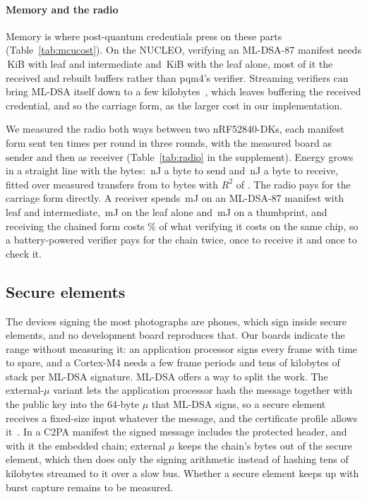 \paragraph{Memory and the radio}
Memory is where post-quantum credentials press on these parts
(Table~\ref{tab:mcucost}). On the NUCLEO, verifying an ML-DSA-87 manifest
needs \NramChainDSAeightyseven\,KiB with leaf and intermediate and
\NramLeafDSAeightyseven\,KiB with the leaf alone, most of it the received and
rebuilt buffers rather than pqm4's verifier. Streaming verifiers can bring
ML-DSA itself down to a few
kilobytes~\cite{gonzalez2021verifying,bos2022dilithium}, which leaves buffering the
received credential, and so the carriage form, as the larger cost in our
implementation.


We measured the radio both ways between two nRF52840-DKs, each manifest form
sent ten times per round in three rounds, with the measured board as sender
and then as receiver (Table~\ref{tab:radio} in the supplement). Energy grows in a straight line
with the bytes: \NbleTxNj\,nJ a byte to send and \NbleRxNj\,nJ a byte to
receive, fitted over \NbleTxN{} measured transfers from \NbleTxXmin{} to
\NbleTxXmax{} bytes with $R^2$ of \NbleTxRsq. The radio pays for the carriage form directly. A receiver spends
\NrecvMChainDSAeightyseven\,mJ on an ML-DSA-87 manifest with leaf and
intermediate, \NrecvMLeafDSAeightyseven\,mJ on the leaf alone and
\NrecvMThumbDSAeightyseven\,mJ on a thumbprint, and receiving the chained
form costs \NrecvShareVerify\% of what verifying it costs on the same chip, so
a battery-powered verifier pays for the chain twice, once to receive it and
once to check it.



\subsection{Secure elements}
\label{sec:constrained}

The devices signing the most photographs are phones, which sign inside secure
elements, and no development board reproduces that. Our boards indicate the range without measuring it: an application processor signs every frame with time to
spare, and a Cortex-M4 needs a few frame periods and tens of kilobytes of
stack per ML-DSA signature. ML-DSA offers a way to split the work. The
external-$\mu$ variant lets the application processor hash the message
together with the public key into the 64-byte $\mu$ that ML-DSA signs, so a
secure element receives a fixed-size input whatever the message, and the
certificate profile allows it~\cite{fips204,rfc9881}. In a C2PA manifest the
signed message includes the protected header, and with it the embedded chain;
external $\mu$ keeps the chain's bytes out of the secure element, which then
does only the signing arithmetic instead of hashing tens of kilobytes streamed
to it over a slow bus. Whether a secure element keeps
up with burst capture remains to be measured.
